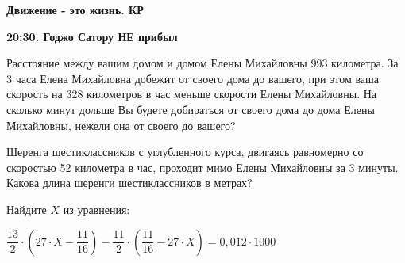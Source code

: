 \centerline{\bf \Huge Движение - это жизнь. КР}
\centerline{\bf \Huge }

\begin{flushright}
        \scriptsize{\textbf{20:30. Годжо Сатору НЕ прибыл}}
\end{flushright}

 Расстояние между вашим домом и домом Елены Михайловны 993 километра. За 3 часа Елена Михайловна добежит от своего дома до вашего, при этом ваша скорость на 328 километров в час меньше скорости Елены Михайловны. На сколько минут дольше Вы будете добираться от своего дома до дома Елены Михайловны, нежели она от своего до вашего?


 Шеренга шестиклассников с углубленного курса, двигаясь равномерно со скоростью 52 километра в час, проходит мимо Елены Михайловны за 3 минуты. Какова длина шеренги шестиклассников в метрах?

 Найдите $X$ из уравнения:

$\dfrac{13}{2}\cdot(27\cdot X-\dfrac{11}{16})-\dfrac{11}{2}\cdot(\dfrac{11}{16}-27\cdot X)=0,012\cdot1000$
